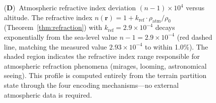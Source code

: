 \begin{figure}[!htbp]
{    (\textbf{D})~Atmospheric refractive index deviation $(n - 1) \times 10^4$ versus altitude. The refractive index $n(\mathbf{r}) = 1 + k_{\mathrm{ref}} \cdot \rho_{\mathrm{atm}}/\rho_0$ (Theorem~\ref{thm:refraction}) with $k_{\mathrm{ref}} = 2.9 \times 10^{-4}$ decays exponentially from the sea-level value $n - 1 = 2.9 \times 10^{-4}$ (red dashed line, matching the measured value $2.93 \times 10^{-4}$ to within 1.0\%). The shaded region indicates the refractive index range responsible for atmospheric refraction phenomena (mirages, looming, astronomical seeing). This profile is computed entirely from the terrain partition state through the four encoding mechanisms---no external atmospheric data is required.}
    \label{fig:terrain_atmosphere}
\end{figure}

